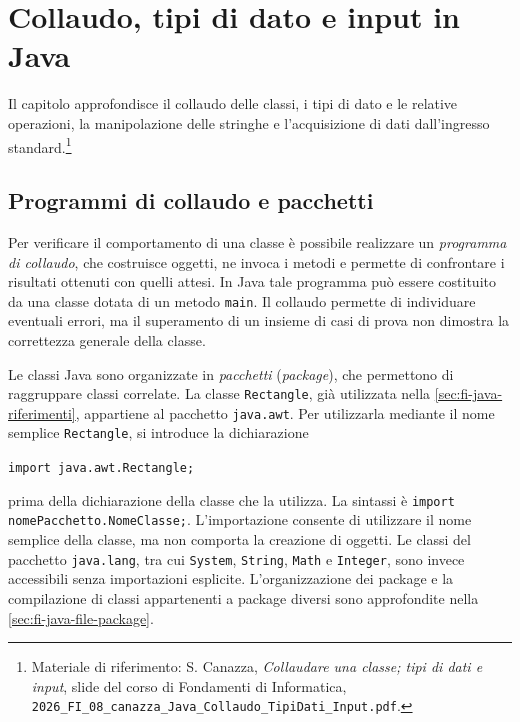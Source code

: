\chapter{Collaudo, tipi di dato e input in Java}
\label{chap:collaudo-tipi-input-java}

Il capitolo approfondisce il collaudo delle classi, i tipi di dato
e le relative operazioni, la manipolazione delle stringhe e
l'acquisizione di dati dall'ingresso standard.\footnote{Materiale
di riferimento: S. Canazza, \emph{Collaudare una classe; tipi di
dati e input}, slide del corso di Fondamenti di Informatica,
\nolinkurl{2026_FI_08_canazza_Java_Collaudo_TipiDati_Input.pdf}.}

\section{Programmi di collaudo e pacchetti}
\label{sec:fi-java-collaudo}

Per verificare il comportamento di una classe è possibile
realizzare un \emph{programma di collaudo}, che costruisce
oggetti, ne invoca i metodi e permette di confrontare i risultati ottenuti
con quelli attesi. In Java tale programma può essere costituito
da una classe dotata di un metodo \texttt{main}. Il collaudo
permette di individuare eventuali errori, ma il superamento
di un insieme di casi di prova non dimostra la correttezza
generale della classe.

Le classi Java sono organizzate in \emph{pacchetti}
(\emph{package}), che permettono di raggruppare classi
correlate. La classe \texttt{Rectangle}, già utilizzata
nella \cref{sec:fi-java-riferimenti}, appartiene al pacchetto
\texttt{java.awt}. Per utilizzarla mediante il nome semplice
\texttt{Rectangle}, si introduce la dichiarazione
\begin{center}
  \texttt{import java.awt.Rectangle;}
\end{center}
prima della dichiarazione della classe che la utilizza.
La sintassi è
\texttt{import nomePacchetto.NomeClasse;}.
L'importazione consente di utilizzare il nome semplice
della classe, ma non comporta la creazione di oggetti.
Le classi del pacchetto \texttt{java.lang}, tra cui
\texttt{System}, \texttt{String}, \texttt{Math} e
\texttt{Integer}, sono invece accessibili senza
importazioni esplicite. L'organizzazione dei package e la
compilazione di classi appartenenti a package diversi
sono approfondite nella \cref{sec:fi-java-file-package}.

